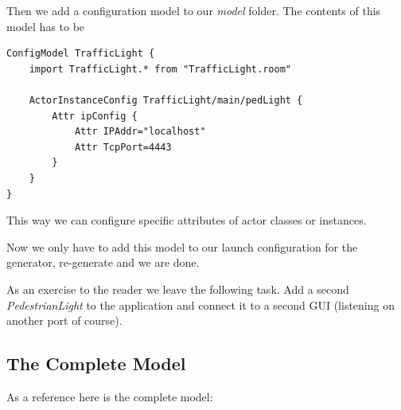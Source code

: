 Then we add a configuration model to our \textit{model} folder.
The contents of this model has to be

\begin{lstlisting}[language=config]
ConfigModel TrafficLight {
	import TrafficLight.* from "TrafficLight.room"
	
	ActorInstanceConfig TrafficLight/main/pedLight {
		Attr ipConfig {
			Attr IPAddr="localhost"
			Attr TcpPort=4443
		}
	}
}
\end{lstlisting}

This way we can configure specific attributes of actor classes or instances.

Now we only have to add this model to our launch configuration for the generator, re-generate and we are done.

As an exercise to the reader we leave the following task. Add a second \textit{PedestrianLight} to the application and connect
it to a second GUI (listening on another port of course).

\subsection{The Complete Model}

As a reference here is the complete model:

